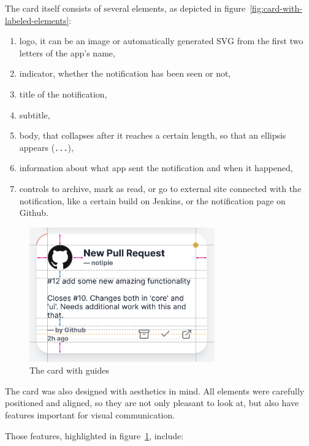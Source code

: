 The card itself consists of several elements,
as depicted in figure~\ref{fig:card-with-labeled-elements}:

\begin{enumerate}
      \item
            logo,
            it can be an image
            or automatically generated SVG
            from the first two letters of the app's name,
      \item
            indicator,
            whether the notification has been seen or not,
      \item
            title of the notification,
      \item
            subtitle,
      \item
            body,
            that collapses after it reaches a certain length,
            so that an ellipsis appears (\texttt{...}),
      \item
            information about what app sent the notification and when it happened,
      \item
            controls to archive,
            mark as read,
            or go to external site connected with the notification,
            like a certain build on Jenkins,
            or the notification page on Github.
\end{enumerate}

\begin{figure}[h]
      \centering
      \includegraphics[width=8cm,keepaspectratio]{img/card_guides.png}
      \caption{The card with guides}
      \label{fig:card-with-guides}
\end{figure}

The card was also designed with aesthetics in mind.
All elements were carefully positioned and aligned,
so they are not only pleasant to look at,
but also have features important for visual communication.

Those features, highlighted in figure~\ref{fig:card-with-guides}, include:

